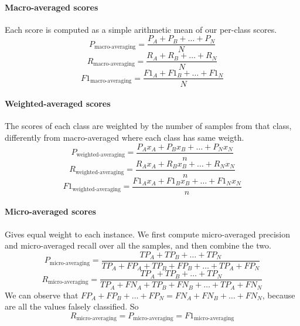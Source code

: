 \paragraph{Macro-averaged scores}
Each score is computed as a simple arithmetic mean of our per-class scores.
\begin{equation}
    P_\text{macro-averaging} = \frac{P_A + P_B + \dots + P_N}{N}
\end{equation}
\begin{equation}
    R_\text{macro-averaging} = \frac{R_A + R_B + \dots + R_N}{N}
\end{equation}
\begin{equation}
    F1_\text{macro-averaging} = \frac{F1_A + F1_B + \dots + F1_N}{N}
\end{equation}
\paragraph{Weighted-averaged scores}
The scores of each class are weighted by the number of samples from that class, differently from macro-averaged where each class has same weigth.
\begin{equation}
    P_\text{weighted-averaging} = \frac{P_A x_A + P_B x_B + \dots + P_N x_N}{n}
\end{equation}
\begin{equation}
    R_\text{weighted-averaging} = \frac{R_A x_A + R_B x_B + \dots + R_N x_N}{n}
\end{equation}
\begin{equation}
    F1_\text{weighted-averaging} = \frac{F1_A x_A + F1_B x_B + \dots + F1_N x_N}{n}
\end{equation}
\paragraph{Micro-averaged scores}
Gives equal weight to each instance. We first compute micro-averaged precision and micro-averaged recall over all the samples, and then combine the two.
\begin{equation}
    P_\text{micro-averaging} = \frac{TP_A + TP_B + \dots + TP_N}{TP_A + FP_A + TP_B + FP_B + \dots + TP_A + FP_N}
\end{equation}
\begin{equation}
    R_\text{micro-averaging} = \frac{TP_A + TP_B + \dots + TP_N}{TP_A + FN_A + TP_B + FN_B + \dots + TP_A + FN_N}
\end{equation}
We can observe that \(FP_A + FP_B + \dots + FP_N = FN_A + FN_B + \dots + FN_N\), because are all the values falsely classified. So 
\begin{equation}
    R_\text{micro-averaging}= P_\text{micro-averaging} = F1_\text{micro-averaging}
\end{equation}

